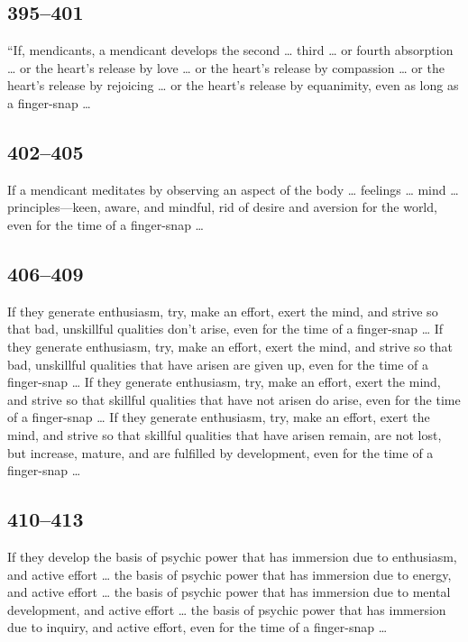 \documentclass[12pt,openany]{book}%
\begin{document}
\subsection*{395–401 }

“If, mendicants, a mendicant develops the second … third … or fourth absorption … or the heart’s release by love … or the heart’s release by compassion … or the heart’s release by rejoicing … or the heart’s release by equanimity, even as long as a finger-snap … 

\subsection*{402–405 }

If a mendicant meditates by observing an aspect of the body … feelings … mind … principles—keen, aware, and mindful, rid of desire and aversion for the world, even for the time of a finger-snap … 

\subsection*{406–409 }

If they generate enthusiasm, try, make an effort, exert the mind, and strive so that bad, unskillful qualities don’t arise, even for the time of a finger-snap … If they generate enthusiasm, try, make an effort, exert the mind, and strive so that bad, unskillful qualities that have arisen are given up, even for the time of a finger-snap … If they generate enthusiasm, try, make an effort, exert the mind, and strive so that skillful qualities that have not arisen do arise, even for the time of a finger-snap … If they generate enthusiasm, try, make an effort, exert the mind, and strive so that skillful qualities that have arisen remain, are not lost, but increase, mature, and are fulfilled by development, even for the time of a finger-snap … 

\subsection*{410–413 }

If they develop the basis of psychic power that has immersion due to enthusiasm, and active effort … the basis of psychic power that has immersion due to energy, and active effort … the basis of psychic power that has immersion due to mental development, and active effort … the basis of psychic power that has immersion due to inquiry, and active effort, even for the time of a finger-snap … 
\end{document}
